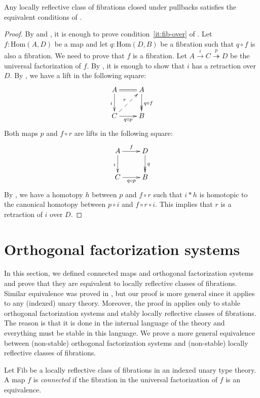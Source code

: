 \documentclass[reqno]{mscs}
\newcommand{\fs}[1]{\mathrm{#1}}
\newcommand{\Hom}{\fs{Hom}}
\newcommand{\Fib}{\fs{Fib}}
\numberwithin{figure}{section}
\begin{document}
\begin{prop}
Any locally reflective class of fibrations closed under pullbacks satisfies the equivalent conditions of .
\end{prop}
\begin{proof}
By  and , it is enough to prove condition~\eqref{it:fib-over} of .
Let $f : \Hom(A,D)$ be a map and let $q : \Hom(D,B)$ be a fibration such that $q \circ f$ is also a fibration.
We need to prove that $f$ is a fibration.
Let $A \xrightarrow{i} C \overset{p}\twoheadrightarrow D$ be the universal factorization of $f$.
By , it is enough to show that $i$ has a retraction over $D$.
By , we have a lift in the following square:
\[ \xymatrix{ A \ar@{=}[r] \ar[d]_i                 & A \ar@{->>}[d]^{q \circ f} \\
              C \ar[r]_{q \circ p} \ar@{-->}[ur]^r  & B
            } \]
Both maps $p$ and $f \circ r$ are lifts in the following square:
\[ \xymatrix{ A \ar[r]^f \ar[d]_i   & D \ar@{->>}[d]^q \\
              C \ar[r]_{q \circ p}  & B
            } \]
By , we have a homotopy $h$ between $p$ and $f \circ r$ such that $i * h$ is homotopic to the canonical homotopy between $p \circ i$ and $f \circ r \circ i$.
This implies that $r$ is a retraction of $i$ over $D$.
\end{proof}

\section{Orthogonal factorization systems}
\label{sec:orth}

In this section, we defined connected maps and orthogonal factorization systems and prove that they are equivalent to locally reflective classes of fibrations.
Similar equivalence was proved in \cite{modality-hott}, but our proof is more general since it applies to any (indexed) unary theory.
Moreover, the proof in \cite{modality-hott} applies only to stable orthogonal factorization systems and stably locally reflective classes of fibrations.
The reason is that it is done in the internal language of the theory and everything must be stable in this language.
We prove a more general equivalence between (non-stable) orthogonal factorization systems and (non-stable) locally reflective classes of fibrations.

\begin{defn}
Let $\Fib$ be a locally reflective class of fibrations in an indexed unary type theory.
A map $f$ is \emph{connected} if the fibration in the universal factorization of $f$ is an equivalence.
\end{defn}
\end{document}
